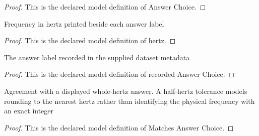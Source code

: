 \begin{proof}
  This is the declared model definition of Answer Choice.
\end{proof}
\begin{definition}[hertz]
  \label{def:physics:phyx-mini-0181:phyxminiproblems-problemphyxmini0181-answerchoice-hertz}
  Frequency in hertz printed beside each answer label
\end{definition}
\begin{proof}
  This is the declared model definition of hertz.
\end{proof}
\begin{definition}
  \label{def:physics:phyx-mini-0181:phyxminiproblems-problemphyxmini0181-recordedanswerchoice}
  The answer label recorded in the supplied dataset metadata
\end{definition}
\begin{proof}
  This is the declared model definition of recorded Answer Choice.
\end{proof}
\begin{definition}
  \label{def:physics:phyx-mini-0181:phyxminiproblems-problemphyxmini0181-matchesanswerchoice}
  Agreement with a displayed whole-hertz answer. A half-hertz tolerance models rounding to the nearest hertz rather than identifying the physical frequency with an exact integer
\end{definition}
\begin{proof}
  This is the declared model definition of Matches Answer Choice.
\end{proof}
